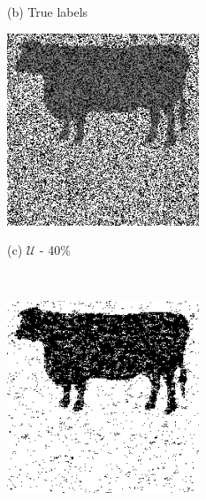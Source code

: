 \documentclass{article}
\def\U{\mathcal{U}}
\begin{document}
\begin{figure}[htb]
\begin{minipage}[b]{.30\linewidth}
      \centerline{(b) True labels}\medskip
    \end{minipage}
    \hfill
    \begin{minipage}[b]{0.30\linewidth}
      \centering
      \centerline{\includegraphics[width=\textwidth,cfbox=black 1pt 0pt]{ress/cow40/cow40_miss.png}}
      \centerline{(c) $\U$ -  40\%  }\medskip
    \end{minipage}
    \\
    \begin{minipage}[b]{0.30\linewidth}
        \centering
        \centerline{\includegraphics[width=\textwidth,cfbox=black 1pt 0pt]{ress/cow40/cow40_vsl.png}}

\end{minipage}
\end{figure}
\end{document}
